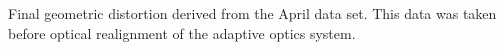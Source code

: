 Final geometric distortion derived from the April data set.  This data was taken before optical realignment of the adaptive optics system.  \label{fig:april_distortion_quiver}